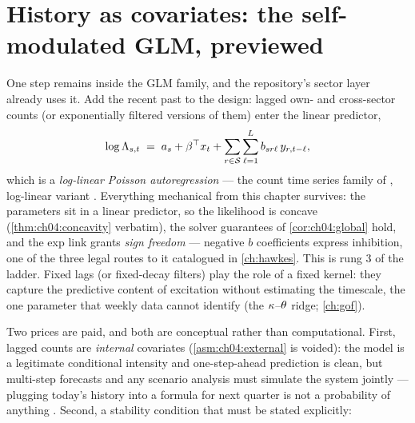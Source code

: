 \section{History as covariates: the self-modulated GLM, previewed}\label{ch04:sec:history}

One step remains inside the GLM family, and the repository's sector layer
already uses it. Add the recent past to the design: lagged own- and
cross-sector counts (or exponentially filtered versions of them) enter
the linear predictor,
\begin{equation}\label{eq:ch04:autoregression}
\log \Lambda_{s,t}
 \;=\;
 a_s + \beta^{\top} x_t
 + \sum_{r \in \mathcal{S}} \sum_{\ell=1}^{L} b_{sr\ell}\, y_{r, t-\ell},
\end{equation}
which is a \emph{log-linear Poisson autoregression} --- the count time
series family of \citet{fokianos2009}, log-linear variant
\citet{fokianos2011}. Everything mechanical from this chapter survives:
the parameters sit in a linear predictor, so the likelihood is concave
(\cref{thm:ch04:concavity} verbatim), the solver guarantees of
\cref{cor:ch04:global} hold, and the exp link grants \emph{sign freedom}
--- negative $b$ coefficients express inhibition, one of the three legal
routes to it catalogued in \cref{ch:hawkes}. This is rung 3 of the
ladder. Fixed lags (or fixed-decay filters)
play the role of a fixed kernel: they capture the predictive content of
excitation without estimating the timescale, the one parameter
that weekly data cannot identify (the $\kappa$--$\theta$ ridge;
\cref{ch:gof}).

Two prices are paid, and both are conceptual rather than computational.
First, lagged counts are \emph{internal} covariates
(\cref{asm:ch04:external} is voided): the model is a legitimate
conditional intensity and one-step-ahead prediction is clean, but
multi-step forecasts and any scenario analysis must simulate the system
jointly --- plugging today's history into a formula for next quarter is
not a probability of anything \citep{kalbfleisch2002}. Second, a
stability condition that must be stated explicitly:

